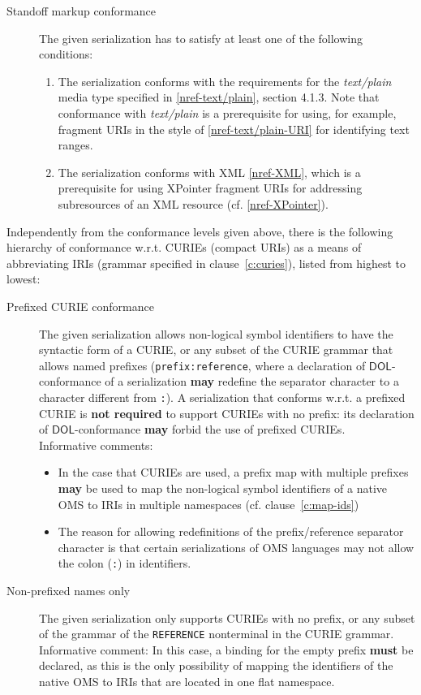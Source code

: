 \documentclass[10pt, a4paper]{isov2}
\makeatletter
\newcommand*{\cf}{cf.\@\xspace}
\newcommand*{\wrt}{w.r.t.\@\xspace}
\newcommand*\CommentAuthor{}
\renewcommand*\CommentAuthor{#1}}
\newcommand*\CommentDate{}
\renewcommand*\CommentDate{#1}}
\newcommand*\CommentId{}
\renewcommand*\CommentId{#1}}
\newcommand*\CommentType{}
\renewcommand*\CommentType{#1}}
\newcommand*{\SetCommentColorByType}[1]{%
\edef\localType{{#1}}%
\expandafter\ifstrequal\localType{q-aut}{\colorlet{CommentColor}{red}}{%
\expandafter\ifstrequal\localType{q-all}{\colorlet{CommentColor}{orange}}{%
\expandafter\ifstrequal\localType{todo}{\colorlet{CommentColor}{orange}}{%
\expandafter\ifstrequal\localType{fyi}{\colorlet{CommentColor}{lightgray}}{%
\colorlet{CommentColor}{yellow}}}}}}
\newcommand*{\SetCommentPrefixByType}[1]{%
\edef\localType{{#1}}%
\expandafter\@ifmtarg\localType{%
\edef\CommentPrefix{}%
}{%
\caseupper[q]{#1}%
\edef\CommentPrefix{\thestring: }%
}}
\newcommand*{\initComment}[1]{%
\setkeys{Comment}{#1}%
\SetCommentColorByType{\CommentType}%
\relax%
\SetCommentPrefixByType{\CommentType}%
\relax%
}
\newcommand*{\todonote}[2][]{%
\initComment{#1}%
\pdfcomment[author=\CommentAuthor,color=CommentColor,date=\CommentDate,id=\CommentId]{%
\CommentPrefix
#2}}
\renewcommand*{\todonote}[2][]{%
\initComment{#1}%
\ednote{\CommentPrefix #2}}
\newcommand*{\mimetype}[1]{\textit{#1}}
\newcommand*{\syntax}[1]{\texttt{#1}}
\newcommand*{\notrequired}{\textbf{not required}\xspace}
\newcommand*{\may}{\textbf{may}\xspace}
\newcommand*{\hasto}{\textbf{must}\xspace}
\newcommand*{\DOL}{\ensuremath{\mathsf{DOL}}\xspace}
\renewcommand{\clauserefname}{clause}
\renewcommand{\noterefname}{note}
\renewcommand{\cref}[1]{\clauserefname~\ref{#1}}
\renewcommand{\nref}[1]{\noterefname~\ref{#1}}
\renewcommand{\nref}[1]{\ref{nref-#1}}
\makeatother
\begin{document}
\begin{description}
\item[Standoff markup conformance]
The given serialization has to satisfy at least one of the following conditions:
 \begin{enumerate} 
\item\label{it:standoff-text-plain} The serialization conforms with the requirements for the \mimetype{text/plain} media type specified in \nref{text/plain}, section 4.1.3.
Note that conformance with \mimetype{text/plain} is a prerequisite for using, for
example, fragment URIs in the style of \nref{text/plain-URI} for identifying text ranges.
\item\label{it:standoff-xpointer} The serialization conforms with XML \nref{XML}, which is a prerequisite for using XPointer fragment URIs for addressing subresources of an XML resource (cf. \nref{XPointer}).
 \end{enumerate} 
 \end{description} 


Independently from the conformance levels given above, there is the following hierarchy of conformance \wrt CURIEs (compact URIs) as a means of abbreviating IRIs (grammar specified in \cref{c:curies}), listed from highest to lowest:
 \begin{description} 
\item[Prefixed CURIE conformance] The given serialization allows non-logical symbol identifiers to have the syntactic form of a CURIE, or any subset of the CURIE grammar that allows named prefixes (\syntax{prefix:reference}, where a declaration of \DOL-conformance of a serialization \may redefine the separator character to a character different from \syntax{:}).  A serialization that conforms \wrt a prefixed CURIE  is \notrequired to support CURIEs with no prefix: its declaration of \DOL-conformance \may forbid the use of prefixed CURIEs.\\
  Informative comments:
   \begin{itemize} 
  \item In the case that CURIEs are used, a prefix map with multiple prefixes \may be used to map the non-logical symbol identifiers of a native OMS to IRIs in multiple namespaces (\cf \cref{c:map-ids})
  \item The reason for allowing redefinitions of the prefix/reference separator character is that certain serializations of OMS languages may not allow the colon (\syntax{:}) in identifiers.
   \end{itemize} 
\item[Non-prefixed names only] The given serialization only supports CURIEs with no prefix, or any subset of the grammar of the \syntax{REFERENCE} nonterminal in the CURIE grammar.\\
  Informative comment: In this case, a binding for the empty prefix \hasto be declared, as this is the only possibility of mapping the identifiers of the native OMS to IRIs that are located in one flat namespace.
 \end{description} 
\end{document}
